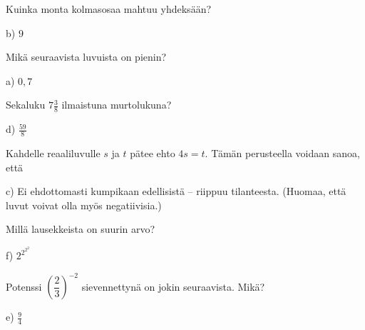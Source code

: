 \begin{multicols}{2}
\begin{tehtava}
Kuinka monta kolmasosaa mahtuu yhdeksään?
    \begin{vastaus}
	 b) $9$
    \end{vastaus}
\end{tehtava}

\begin{tehtava}
Mikä seuraavista luvuista on pienin?
    \begin{vastaus}
	 a) $0,7$
    \end{vastaus}
\end{tehtava}

\begin{tehtava} %
Sekaluku $7\frac{3}{8}$ ilmaistuna murtolukuna?
    \begin{vastaus}
	 d) $\frac{59}{8}$
    \end{vastaus}
\end{tehtava}

\begin{tehtava}
Kahdelle reaaliluvulle $s$ ja $t$ pätee ehto $4s=t$. Tämän perusteella voidaan sanoa, että
    \begin{vastaus}
	 c) Ei ehdottomasti kumpikaan edellisistä -- riippuu tilanteesta. (Huomaa, että luvut voivat olla myös negatiivisia.)
    \end{vastaus}
\end{tehtava}

\begin{tehtava}
Millä lausekkeista on suurin arvo?
	\begin{vastaus}
	 f) $2^{2^{2^2}}$
	\end{vastaus}
\end{tehtava}

\begin{tehtava}
Potenssi $\left( \dfrac{2}{3} \right)^{-2}$ sievennettynä on jokin seuraavista. Mikä?
\begin{vastaus}
e) $\frac{9}{4}$
\end{vastaus}
\end{tehtava}


\end{multicols}
